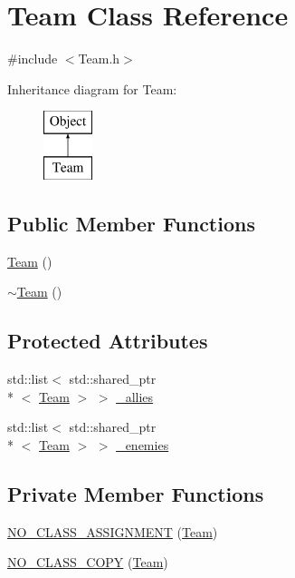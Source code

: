 \section{Team Class Reference}
\label{class_team}


{\ttfamily \#include $<$Team.\-h$>$}

Inheritance diagram for Team\-:\begin{figure}[H]
\begin{center}
\leavevmode
\includegraphics[height=2.000000cm]{class_team}
\end{center}
\end{figure}
\subsection*{Public Member Functions}
\begin{DoxyCompactItemize}
\item 
\hyperlink{class_team_aada295895b747960576b69d8c87a54ba}{Team} ()
\item 
\hyperlink{class_team_ab4218fddd612d52bab47bec4feeb49de}{$\sim$\-Team} ()
\end{DoxyCompactItemize}
\subsection*{Protected Attributes}
\begin{DoxyCompactItemize}
\item 
std\-::list$<$ std\-::shared\-\_\-ptr\\*
$<$ \hyperlink{class_team}{Team} $>$ $>$ \hyperlink{class_team_ac384aa406468eb358569e309bef6f4ac}{\-\_\-allies}
\item 
std\-::list$<$ std\-::shared\-\_\-ptr\\*
$<$ \hyperlink{class_team}{Team} $>$ $>$ \hyperlink{class_team_aa248718aef9829da75ab4376468b991a}{\-\_\-enemies}
\end{DoxyCompactItemize}
\subsection*{Private Member Functions}
\begin{DoxyCompactItemize}
\item 
\hyperlink{class_team_a31432d73e0e52142d1e1d91cca8e50f0}{N\-O\-\_\-\-C\-L\-A\-S\-S\-\_\-\-A\-S\-S\-I\-G\-N\-M\-E\-N\-T} (\hyperlink{class_team}{Team})
\item 
\hyperlink{class_team_ac4aeb8d77b043263b91b585fe9be8a8c}{N\-O\-\_\-\-C\-L\-A\-S\-S\-\_\-\-C\-O\-P\-Y} (\hyperlink{class_team}{Team})
\end{DoxyCompactItemize}
